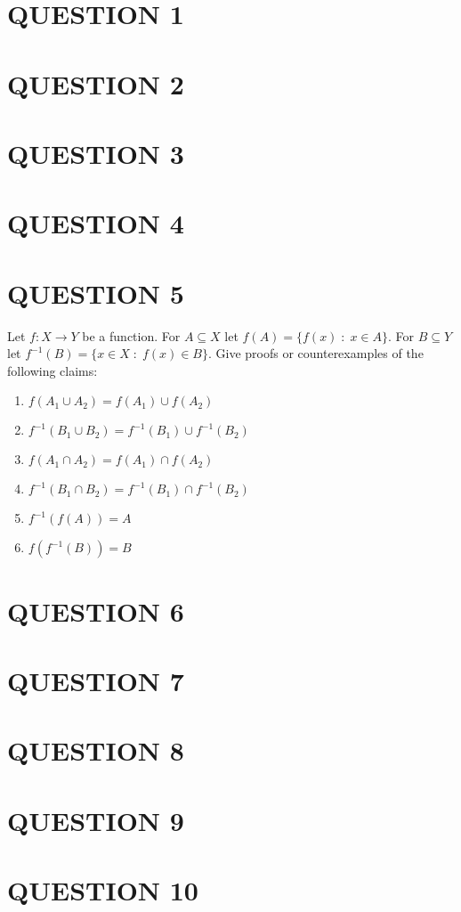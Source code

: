 \documentclass[a4paper]{article}
\begin{document}
	
\maketitle

\section{QUESTION 1}
\section{QUESTION 2}
\section{QUESTION 3}
\section{QUESTION 4}
\section{QUESTION 5}

Let $ f: X \to Y  $ be a function. For $ A \subseteq X $ let $ f(A) = \{ f(x) \; : \; x \in A \} $. For $ B \subseteq Y $ let $ f^{-1}(B) = \{ x \in X \; : \; f(x) \in B   \} $. Give proofs or counterexamples of the following claims:

\begin{enumerate} [label=(\alph*)]
	\item $ f(A_{1} \cup A_{2}) = f(A_{1}) \cup f(A_{2}) $
	\item $ f^{-1} (B_{1} \cup B_{2}) = f^{-1}(B_{1}) \cup f^{-1}(B_{2}) $
	\item $ f(A_{1} \cap A_{2}) = f(A_{1}) \cap f(A_{2}) $
	\item $ f^{-1} (B_{1} \cap B_{2}) = f^{-1}(B_{1}) \cap f^{-1}(B_{2}) $
	\item $ f^{-1}(f(A)) = A $
	\item $ f(f^{-1}(B)) = B $
\end{enumerate}
\section{QUESTION 6}
\section{QUESTION 7}
\section{QUESTION 8}
\section{QUESTION 9}
\section{QUESTION 10}
\end{document}
